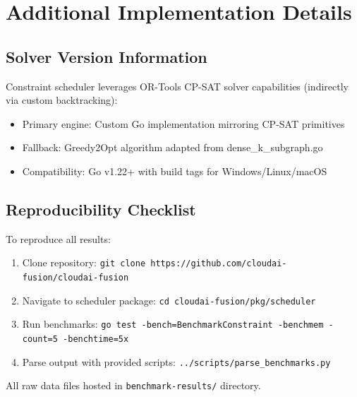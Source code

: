 \documentclass[11pt, twoside]{article}
\begin{document}
\appendix

\section{Additional Implementation Details}

\subsection{Solver Version Information}

Constraint scheduler leverages OR-Tools CP-SAT solver capabilities (indirectly via custom backtracking):
\begin{itemize}
\item Primary engine: Custom Go implementation mirroring CP-SAT primitives
\item Fallback: Greedy2Opt algorithm adapted from dense\_k\_subgraph.go
\item Compatibility: Go v1.22+ with build tags for Windows/Linux/macOS
\end{itemize}

\subsection{Reproducibility Checklist}

To reproduce all results:
\begin{enumerate}
\item Clone repository: \texttt{git clone https://github.com/cloudai-fusion/cloudai-fusion}
\item Navigate to scheduler package: \texttt{cd cloudai-fusion/pkg/scheduler}
\item Run benchmarks: \texttt{go test -bench=BenchmarkConstraint -benchmem -count=5 -benchtime=5x}
\item Parse output with provided scripts: \texttt{../scripts/parse\_benchmarks.py}
\end{enumerate}

All raw data files hosted in \texttt{benchmark-results/} directory.
\end{document}
